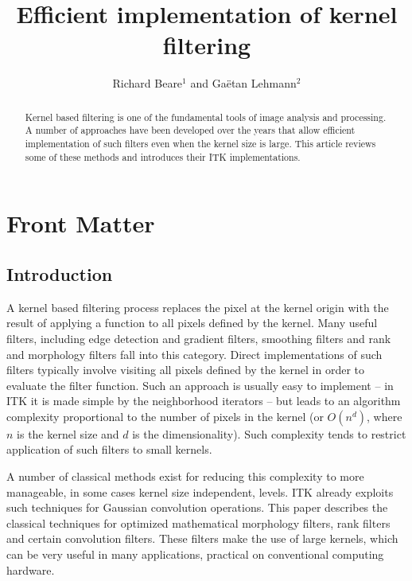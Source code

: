 \documentclass{InsightArticle}
\title{Efficient implementation of kernel filtering}
\author{Richard Beare{$^1$} {\small{and}} Ga\"etan Lehmann{$^2$}}
\begin{document}
\maketitle

\ifhtml
\chapter*{Front Matter\label{front}}
\fi


\begin{abstract}
\noindent
Kernel based filtering is one of the fundamental tools of image
analysis and processing. A number of approaches have been developed
over the years that allow efficient implementation of such filters
even when the kernel size is large. This article reviews some of these
methods and introduces their ITK implementations.
\end{abstract}

\tableofcontents

\section{Introduction}
A kernel based filtering process replaces the pixel at the kernel
origin with the result of applying a function to all pixels defined by
the kernel. Many useful filters, including edge detection and gradient
filters, smoothing filters and rank and morphology filters fall into
this category. Direct implementations of such filters typically
involve visiting all pixels defined by the kernel in order to evaluate
the filter function. Such an approach is usually easy to implement
-- in ITK it is made simple by the neighborhood iterators -- but leads
to an algorithm complexity proportional to the number of pixels in the
kernel (or $O(n^d)$, where $n$ is the kernel size and $d$ is the
dimensionality). Such complexity tends to restrict application of such
filters to small kernels.

A number of classical methods exist for reducing this complexity to
more manageable, in some cases kernel size independent, levels. ITK
already exploits such techniques for Gaussian convolution
operations. This paper describes the classical techniques for
optimized mathematical morphology filters, rank filters and certain
convolution filters. These filters make the use of large kernels,
which can be very useful in many applications, practical on
conventional computing hardware.
\end{document}

